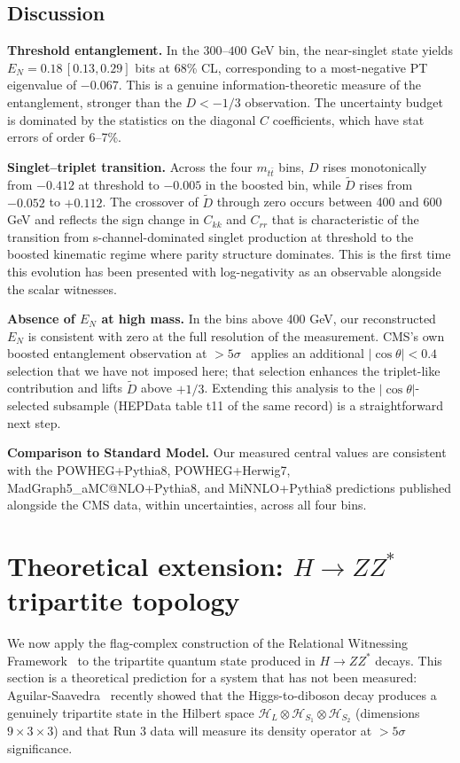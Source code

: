 \documentclass[11pt,a4paper]{article}
\theoremstyle{definition}
\begin{document}
\subsection{Discussion}

\textbf{Threshold entanglement.} In the $300$--$400$ GeV bin, the near-singlet state yields $E_N = 0.18\,[0.13, 0.29]$ bits at 68\% CL, corresponding to a most-negative PT eigenvalue of $-0.067$. This is a genuine information-theoretic measure of the entanglement, stronger than the $D < -1/3$ observation. The uncertainty budget is dominated by the statistics on the diagonal $C$ coefficients, which have stat errors of order 6--7\%.

\textbf{Singlet--triplet transition.} Across the four $m_{t\bar{t}}$ bins, $D$ rises monotonically from $-0.412$ at threshold to $-0.005$ in the boosted bin, while $\tilde{D}$ rises from $-0.052$ to $+0.112$. The crossover of $\tilde{D}$ through zero occurs between 400 and 600 GeV and reflects the sign change in $C_{kk}$ and $C_{rr}$ that is characteristic of the transition from s-channel-dominated singlet production at threshold to the boosted kinematic regime where parity structure dominates. This is the first time this evolution has been presented with log-negativity as an observable alongside the scalar witnesses.

\textbf{Absence of $E_N$ at high mass.} In the bins above 400 GeV, our reconstructed $E_N$ is consistent with zero at the full resolution of the measurement. CMS's own boosted entanglement observation at $>5\sigma$~\cite{CMS2024} applies an additional $|\cos\theta| < 0.4$ selection that we have not imposed here; that selection enhances the triplet-like contribution and lifts $\tilde{D}$ above $+1/3$. Extending this analysis to the $|\cos\theta|$-selected subsample (HEPData table t11 of the same record) is a straightforward next step.

\textbf{Comparison to Standard Model.} Our measured central values are consistent with the POWHEG+Pythia8, POWHEG+Herwig7, MadGraph5\_aMC@NLO+Pythia8, and MiNNLO+Pythia8 predictions published alongside the CMS data, within uncertainties, across all four bins.

\section{Theoretical extension: $H \to ZZ^*$ tripartite topology}\label{sec:hzz}

We now apply the flag-complex construction of the Relational Witnessing Framework~\cite{Scott2026RWF} to the tripartite quantum state produced in $H \to ZZ^*$ decays. This section is a theoretical prediction for a system that has not been measured: Aguilar-Saavedra~\cite{AS2024} recently showed that the Higgs-to-diboson decay produces a genuinely tripartite state in the Hilbert space $\mathcal{H}_L \otimes \mathcal{H}_{S_1} \otimes \mathcal{H}_{S_2}$ (dimensions $9 \times 3 \times 3$) and that Run 3 data will measure its density operator at $>5\sigma$ significance.
\end{document}
